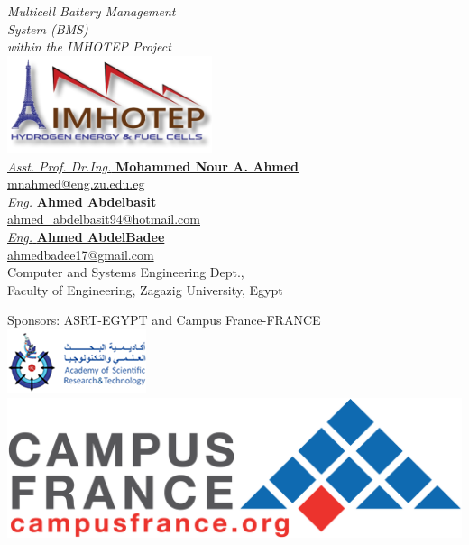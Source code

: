\documentclass[%
DIV=12,
abstract=on
12pt,			%
]
{scrartcl} %
\begin{document}
     \begingroup%
    \raggedleft
    \vspace*{\baselineskip}
    {\Huge\itshape Multicell Battery Management \\
        System (BMS)\\[0.3\baselineskip]
    {\Large within the IMHOTEP Project}}\\[5\baselineskip]
    \includegraphics[width=0.45\textwidth]{IMHOTEPShadow}\\[5\baselineskip]
    {\Large \href{http://www.mnahmed.faculty.zu.edu.eg}{\emph{\small  Asst. Prof. Dr.Ing.} \textbf{Mohammed Nour A. Ahmed}}\\
        \href{mailto:mnahmed@eng.zu.edu.eg}{mnahmed@eng.zu.edu.eg}}\\[0.3\baselineskip]   
    {\Large \href{mailto:ahmed_abdelbasit94@hotmail.com}{\emph{\small  Eng.} \textbf{Ahmed Abdelbasit}}\\
    \href{mailto:ahmed_abdelbasit94@hotmail.com}{ahmed\_abdelbasit94@hotmail.com}}\\[0.3\baselineskip] 
   
    
     {\Large \href{mailto:ahmedbadee17@gmail.com}{\emph{\small  Eng.}  \textbf{Ahmed AbdelBadee}}\\
        \href{mailto:ahmedbadee17@gmail.com}{ahmedbadee17@gmail.com}\\
     Computer and Systems Engineering Dept.,\\
    Faculty of Engineering, Zagazig University, Egypt}\\
    \par
    \vfill
    {\sffamily Sponsors: ASRT-EGYPT and  Campus France-FRANCE\\ 
      \hfill \includegraphics[width=0.25\linewidth]{figures/ASRTlogo} \quad          \includegraphics[width=0.25\linewidth]{figures/CampusFranceLogo}}
        \vspace*{\baselineskip}
        \endgroup
\end{document}
